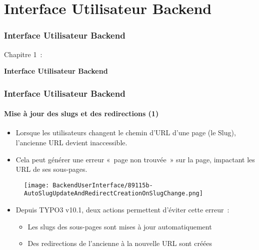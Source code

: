 %

\section{Interface Utilisateur Backend}
\begin{frame}[fragile]
	\frametitle{Interface Utilisateur Backend}

	\begin{center}\huge{Chapitre 1~:}\end{center}
	\begin{center}\huge{\color{typo3darkgrey}\textbf{Interface Utilisateur Backend}}\end{center}

\end{frame}


\begin{frame}[fragile]
	\frametitle{Interface Utilisateur Backend}
	\framesubtitle{Mise à jour des slugs et des redirections (1)}

	\begin{itemize}
		\item Lorsque les utilisateurs changent le chemin d'URL d'une page (le Slug),
			l'ancienne URL devient inaccessible.
		\item Cela peut générer une erreur «~page non trouvée~» sur la page,
			impactant les URL de ses sous-pages.
	\end{itemize}

	\begin{figure}
		\texttt{[image: BackendUserInterface/89115b-AutoSlugUpdateAndRedirectCreationOnSlugChange.png]}
	\end{figure}

	\begin{itemize}
		\item Depuis TYPO3 v10.1, deux actions permettent d'éviter cette erreur~:

			\begin{itemize}
				\item Les slugs des sous-pages sont mises à jour automatiquement
				\item Des redirections de l'ancienne à la nouvelle URL sont créées
			\end{itemize}

	\end{itemize}

\end{frame}

